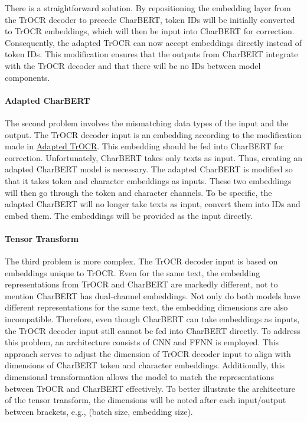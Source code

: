 There is a straightforward solution. By repositioning the embedding layer from the TrOCR decoder to precede CharBERT, token IDs will be initially converted to TrOCR embeddings, which will then be input into CharBERT for correction. Consequently, the adapted TrOCR can now accept embeddings directly instead of token IDs. This modification ensures that the outputs from CharBERT integrate with the TrOCR decoder and that there will be no IDs between model components.

\paragraph*{Adapted CharBERT}
\label{par:3_adapted_charbert}
The second problem involves the mismatching data types of the input and the output. The TrOCR decoder input is an embedding according to the modification made in \hyperref[par:3_adapted_trocr]{Adapted TrOCR}. This embedding should be fed into CharBERT for correction. Unfortunately, CharBERT takes only texts as input. Thus, creating an adapted CharBERT model is necessary. The adapted CharBERT is modified so that it takes token and character embeddings as inputs. These two embeddings will then go through the token and character channels. To be specific, the adapted CharBERT will no longer take texts as input, convert them into IDs and embed them. The embeddings will be provided as the input directly.

\paragraph*{Tensor Transform}
\label{par:3_tensor_transform}
The third problem is more complex. The TrOCR decoder input is based on embeddings unique to TrOCR. Even for the same text, the embedding representations from TrOCR and CharBERT are markedly different, not to mention CharBERT has dual-channel embeddings. Not only do both models have different representations for the same text, the embedding dimensions are also incompatible. Therefore, even though CharBERT can take embeddings as inputs, the TrOCR decoder input still cannot be fed into CharBERT directly. To address this problem, an architecture consists of CNN and FFNN is employed. This approach serves to adjust the dimension of TrOCR decoder input to align with dimensions of CharBERT token and character embeddings. Additionally, this dimensional transformation allows the model to match the representations between TrOCR and CharBERT effectively. To better illustrate the architecture of the tensor transform, the dimensions will be noted after each input/output between brackets, e.g., (batch size, embedding size).

